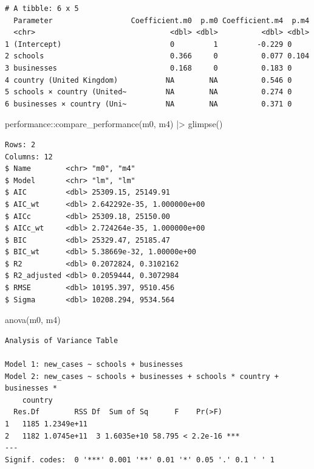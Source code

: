\documentclass[
  letterpaper,
  DIV=11,
  numbers=noendperiod]{scrreprt}
\newenvironment{Shaded}{\begin{snugshade}}{\end{snugshade}}
\newcommand{\FunctionTok}[1]{\textcolor[rgb]{0.28,0.35,0.67}{#1}}
\newcommand{\NormalTok}[1]{\textcolor[rgb]{0.00,0.23,0.31}{#1}}
\newcommand{\SpecialCharTok}[1]{\textcolor[rgb]{0.37,0.37,0.37}{#1}}
\begin{document}
\begin{verbatim}
# A tibble: 6 x 5
  Parameter                  Coefficient.m0  p.m0 Coefficient.m4  p.m4
  <chr>                               <dbl> <dbl>          <dbl> <dbl>
1 (Intercept)                         0         1         -0.229 0    
2 schools                             0.366     0          0.077 0.104
3 businesses                          0.168     0          0.183 0    
4 country (United Kingdom)           NA        NA          0.546 0    
5 schools × country (United~         NA        NA          0.274 0    
6 businesses × country (Uni~         NA        NA          0.371 0    
\end{verbatim}

\begin{Shaded}
\begin{Highlighting}[]
\NormalTok{performance}\SpecialCharTok{::}\FunctionTok{compare\_performance}\NormalTok{(m0, m4) }\SpecialCharTok{|\textgreater{}}
  \FunctionTok{glimpse}\NormalTok{()}
\end{Highlighting}
\end{Shaded}

\begin{verbatim}
Rows: 2
Columns: 12
$ Name        <chr> "m0", "m4"
$ Model       <chr> "lm", "lm"
$ AIC         <dbl> 25309.15, 25149.91
$ AIC_wt      <dbl> 2.642292e-35, 1.000000e+00
$ AICc        <dbl> 25309.18, 25150.00
$ AICc_wt     <dbl> 2.724264e-35, 1.000000e+00
$ BIC         <dbl> 25329.47, 25185.47
$ BIC_wt      <dbl> 5.38669e-32, 1.00000e+00
$ R2          <dbl> 0.2072824, 0.3102162
$ R2_adjusted <dbl> 0.2059444, 0.3072984
$ RMSE        <dbl> 10195.397, 9510.456
$ Sigma       <dbl> 10208.294, 9534.564
\end{verbatim}

\begin{Shaded}
\begin{Highlighting}[]
\FunctionTok{anova}\NormalTok{(m0, m4)}
\end{Highlighting}
\end{Shaded}

\begin{verbatim}
Analysis of Variance Table

Model 1: new_cases ~ schools + businesses
Model 2: new_cases ~ schools + businesses + schools * country + businesses * 
    country
  Res.Df        RSS Df  Sum of Sq      F    Pr(>F)    
1   1185 1.2349e+11                                   
2   1182 1.0745e+11  3 1.6035e+10 58.795 < 2.2e-16 ***
---
Signif. codes:  0 '***' 0.001 '**' 0.01 '*' 0.05 '.' 0.1 ' ' 1
\end{verbatim}
\end{document}

